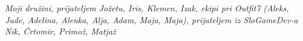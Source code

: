 
\thispagestyle{empty}\mbox{}\vfill\null\it%
\noindent
Moji družini, prijateljem Jožetu, Iris, Klemen, Izak, ekipi pri Outfit7 (Aleks, Jude, Adelina, Alenka, Alja, Adam, Maja, Maja), prijateljem iz SloGameDev-a Nik, Črtomir, Primož, Matjaž
\rm\normalfont


\clearemptydoublepage
